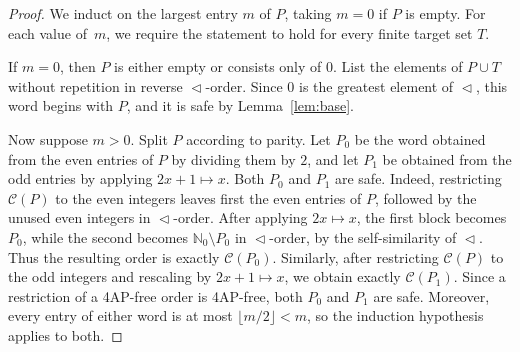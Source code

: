 \documentclass[10pt,a4paper]{amsart}
\newcommand{\C}[1]{\mathcal C(#1)}
\newcommand{\NN}{\mathbb N}
\newcommand{\bits}{\mathrel{\triangleleft}}
\begin{document}
\begin{proof}
We induct on the largest entry $m$ of $P$, taking $m=0$ if $P$ is empty. For
each value of~$m$, we require the statement to hold for every finite target set
$T$.

If $m=0$, then $P$ is either empty or consists only of $0$. List the elements of
$P\cup T$ without repetition in reverse $\bits$-order. Since $0$ is the
greatest element of $\bits$, this word begins with $P$, and it is safe by
Lemma~\ref{lem:base}.

Now suppose $m>0$. Split $P$ according to parity. Let $P_0$ be the word obtained
from the even entries of $P$ by dividing them by $2$, and let $P_1$ be obtained
from the odd entries by applying $2x+1\mapsto x$. Both $P_0$ and $P_1$ are safe.
Indeed, restricting $\C P$ to the even integers leaves first the even entries
of $P$, followed by the unused even integers in $\bits$-order. After applying
$2x\mapsto x$, the first block becomes $P_0$, while the second becomes
$\NN_0\setminus P_0$ in $\bits$-order, by the self-similarity of $\bits$.
Thus the resulting order is exactly $\C{P_0}$.
Similarly, after restricting $\C P$ to the odd integers and rescaling by
$2x+1\mapsto x$, we obtain exactly $\C{P_1}$. Since a restriction of a 4AP-free
order is 4AP-free, both $P_0$ and $P_1$ are safe. Moreover, every entry of
either word is at most $\lfloor m/2\rfloor<m$, so the induction hypothesis
applies to both.


\end{proof}
\end{document}
